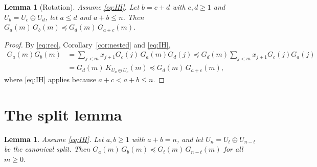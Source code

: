 \documentclass[11pt]{amsart}
\newtheorem{lemma}[theorem]{Lemma}
\theoremstyle{definition}
\theoremstyle{remark}
\newcommand{\pre}{\preceq}
\begin{document}
\begin{lemma}[Rotation]\label{lem:rotation}
Assume \eqref{eq:IH}.
Let $b=c+d$ with $c,d\ge 1$ and $U_b=U_c\oplus U_d$, let $a\le d$ and $a+b\le n$.
Then $G_a(m)\,G_b(m)\pre G_d(m)\,G_{a+c}(m)$.
\end{lemma}

\begin{proof}
By \eqref{eq:rec}, Corollary~\ref{cor:nested} and \eqref{eq:IH},
\begin{align*}
G_a(m)G_b(m)&=\sum_{j<m}x_{j+1}G_c(j)\,G_a(m)G_d(j)
\pre G_d(m)\sum_{j<m}x_{j+1}G_c(j)G_a(j)\\
&=G_d(m)\,K_{U_a\oplus U_c}(m)\pre G_d(m)\,G_{a+c}(m),
\end{align*}
where \eqref{eq:IH} applies because $a+c<a+b\le n$.
\end{proof}

\section{The split lemma}\label{sec:split}

\begin{lemma}\label{lem:split}
Assume \eqref{eq:IH}.
Let $a,b\ge1$ with $a+b=n$, and let $U_n=U_t\oplus U_{n-t}$ be the canonical split.
Then $G_a(m)\,G_b(m)\pre G_t(m)\,G_{n-t}(m)$ for all $m\ge0$.
\end{lemma}
\end{document}
